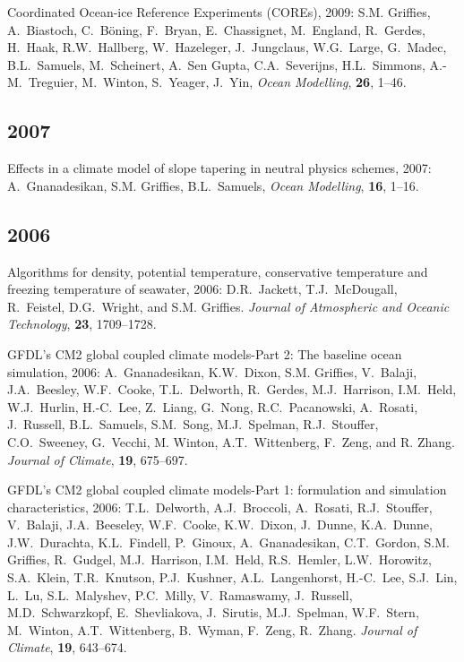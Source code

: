 \begin{etaremune}
\item Coordinated Ocean-ice Reference Experiments (COREs), 2009: S.M. Grif\/f\/ies, A.\ Biastoch, C.\ B\"{o}ning, F.\ Bryan, E.\
  Chassignet, M.\ England, R.\ Gerdes, H.\ Haak, R.W.\ Hallberg, W.\  Hazeleger, J.\ Jungclaus, W.G.\ Large, G.\ Madec, B.L.\ Samuels, M.\  Scheinert, A.\ Sen Gupta, C.A.\ Severijns, H.L.\ Simmons, A.-M.\
  Treguier, M.\ Winton, S.\ Yeager, J.\ Yin,  {\em Ocean Modelling},  {\bf 26}, 1--46.  

\subsection*{\sc \color{Maroon} 2007}

\item Effects in a climate model of slope tapering in neutral physics schemes, 2007: A.\ Gnanadesikan, S.M. Grif\/f\/ies, B.L.\ Samuels, {\em Ocean Modelling}, {\bf 16}, 1--16.
  
\subsection*{\sc \color{Maroon} 2006}

\item Algorithms for density, potential temperature, conservative temperature and freezing temperature of seawater, 2006: D.R.\  Jackett, T.J.\ McDougall, R.\ Feistel, D.G.\ Wright, and S.M. Grif\/f\/ies.  {\em Journal of Atmospheric and Oceanic Technology}, {\bf 23}, 1709--1728.

\item GFDL's CM2 global coupled climate models-Part 2: The baseline ocean simulation, 2006: A.\ Gnanadesikan, K.W.\ Dixon, S.M. Grif\/f\/ies, V.\ Balaji, J.A.\ Beesley, W.F.\ Cooke, T.L.\ Delworth,  R.\ Gerdes, M.J.\ Harrison, I.M.\ Held, W.J.\ Hurlin, H.-C.\ Lee,
  Z.\ Liang, G.\ Nong, R.C.\ Pacanowski, A.\ Rosati, J.\ Russell,  B.L.\ Samuels, S.M.\ Song, M.J.\ Spelman, R.J.\ Stouffer, C.O.\  Sweeney, G.\ Vecchi, M. Winton, A.T.\ Wittenberg, F.\ Zeng, and  R. Zhang.  {\em Journal of Climate}, {\bf 19}, 675--697.

\item GFDL's CM2 global coupled climate models-Part 1: formulation and  simulation characteristics, 2006: T.L.\ Delworth, A.J.\ Broccoli,  A.\ Rosati, R.J.\ Stouffer, V.\ Balaji, J.A.\ Beeseley, W.F.\ Cooke,  K.W.\ Dixon, J.\ Dunne, K.A.\ Dunne, J.W.\ Durachta, K.L.\ Findell,
  P.\ Ginoux, A.\ Gnanadesikan, C.T.\ Gordon, 
  S.M. Grif\/f\/ies,  R.\ Gudgel, M.J.\ Harrison, I.M.\ Held, R.S.\ Hemler, L.W.\  Horowitz, S.A.\ Klein, T.R.\ Knutson, P.J.\ Kushner, A.L.\  Langenhorst, H.-C.\ Lee, S.J.\ Lin, L.\ Lu, S.L.\ Malyshev, P.C.\
  Milly, V.\ Ramaswamy, J.\ Russell, M.D.\ Schwarzkopf, E.\  Shevliakova, J.\ Sirutis, M.J.\ Spelman, W.F.\ Stern, M.\ Winton,  A.T.\ Wittenberg, B.\ Wyman, F.\ Zeng, R.\ Zhang.  {\em Journal of  Climate}, {\bf 19}, 643--674.


\end{etaremune}
